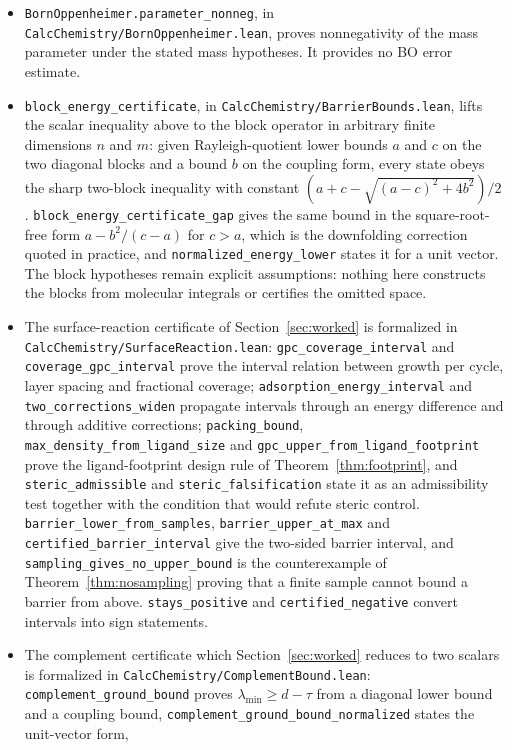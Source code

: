 \documentclass[11pt,a4paper]{article}
\theoremstyle{plain}
\theoremstyle{definition}
\theoremstyle{remark}
\providecommand{\path}[1]{\texttt{#1}}
\begin{document}
\begin{sloppypar}
\begin{itemize}
\item \path{BornOppenheimer.parameter_nonneg}, in
\path{CalcChemistry/BornOppenheimer.lean}, proves nonnegativity of the mass
parameter under the stated mass hypotheses. It provides no BO error estimate.
\item \path{block_energy_certificate}, in
\path{CalcChemistry/BarrierBounds.lean}, lifts the scalar inequality above to
the block operator in arbitrary finite dimensions $n$ and $m$: given
Rayleigh-quotient lower bounds $a$ and $c$ on the two diagonal blocks and a
bound $b$ on the coupling form, every state obeys the sharp two-block inequality
with constant $(a+c-\sqrt{(a-c)^2+4b^2})/2$. \path{block_energy_certificate_gap}
gives the same bound in the square-root-free form $a-b^2/(c-a)$ for $c>a$, which
is the downfolding correction quoted in practice, and
\path{normalized_energy_lower} states it for a unit vector. The block
hypotheses remain explicit assumptions: nothing here constructs the blocks from
molecular integrals or certifies the omitted space.
\item The surface-reaction certificate of Section~\ref{sec:worked} is
formalized in \path{CalcChemistry/SurfaceReaction.lean}:
\path{gpc_coverage_interval} and \path{coverage_gpc_interval} prove the interval
relation between growth per cycle, layer spacing and fractional coverage;
\path{adsorption_energy_interval} and \path{two_corrections_widen} propagate
intervals through an energy difference and through additive corrections;
\path{packing_bound}, \path{max_density_from_ligand_size} and
\path{gpc_upper_from_ligand_footprint} prove the ligand-footprint design rule of
Theorem~\ref{thm:footprint}, and \path{steric_admissible} and
\path{steric_falsification} state it as an admissibility test together with the
condition that would refute steric control.
\path{barrier_lower_from_samples}, \path{barrier_upper_at_max} and
\path{certified_barrier_interval} give the two-sided barrier interval, and
\path{sampling_gives_no_upper_bound} is the counterexample of
Theorem~\ref{thm:nosampling} proving that a finite sample cannot bound a barrier
from above. \path{stays_positive} and \path{certified_negative} convert
intervals into sign statements.
\item The complement certificate which Section~\ref{sec:worked} reduces to two
scalars is formalized in \path{CalcChemistry/ComplementBound.lean}:
\path{complement_ground_bound} proves $\lambda_{\min}\ge d-\tau$ from a
diagonal lower bound and a coupling bound,
\path{complement_ground_bound_normalized} states the unit-vector form,

\end{itemize}
\end{sloppypar}
\end{document}
